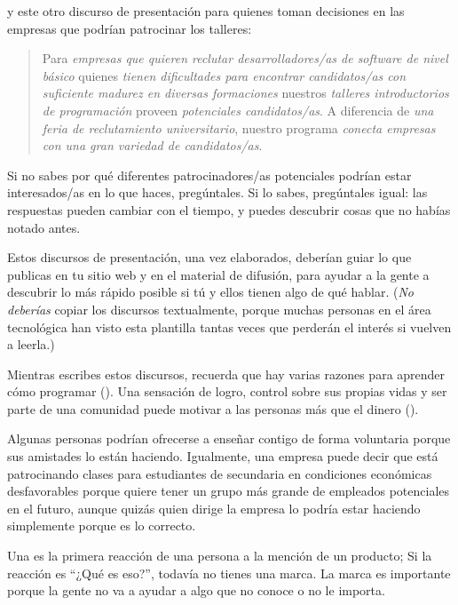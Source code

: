 \noindent
y este otro discurso de presentación para quienes toman decisiones en las empresas que podrían patrocinar los talleres:

\begin{quote}

  Para \emph{empresas que quieren reclutar desarrolladores/as de software de nivel básico}
  quienes \emph{tienen dificultades para encontrar candidatos/as con suficiente madurez en diversas formaciones}
  nuestros \emph{talleres introductorios de programación}
  proveen \emph{potenciales candidatos/as}.
  A diferencia de \emph{una feria de reclutamiento universitario},
  nuestro programa \emph{conecta empresas con una gran variedad de candidatos/as}.
\end{quote}

Si no sabes por qué diferentes patrocinadores/as potenciales podrían estar interesados/as en lo que haces,
pregúntales.
Si lo sabes,
pregúntales igual:
las respuestas pueden cambiar con el tiempo,
y puedes descubrir cosas que no habías notado antes.

Estos discursos de presentación, una vez elaborados,
deberían guiar lo que publicas en tu sitio web y en el material de difusión,
para ayudar a la gente a descubrir lo más rápido posible
si tú y ellos tienen algo de qué hablar.
(\emph{No deberías} copiar los discursos textualmente,
porque
muchas personas en el área tecnológica han visto esta plantilla tantas veces que 
perderán el interés si vuelven a leerla.) 

Mientras escribes estos discursos,
recuerda que hay varias razones para aprender cómo programar ().
Una sensación de logro,
control sobre sus propias vidas
y ser parte de una comunidad puede motivar a las personas más que el dinero
().

Algunas personas podrían ofrecerse a enseñar contigo de forma voluntaria  
porque sus amistades lo están haciendo. Igualmente, una empresa puede decir que 
está patrocinando clases para estudiantes de secundaria en condiciones económicas desfavorables 
porque quiere tener un grupo más grande de empleados potenciales en el futuro, 
aunque quizás quien dirige la empresa lo podría estar haciendo simplemente porque es lo correcto.


Una  es la primera reacción de una persona a la mención de un producto;
Si la reacción es ``¿Qué es eso?'',
todavía no tienes una marca.
La marca es importante porque
la gente no va a ayudar a algo que no conoce o no le importa.

